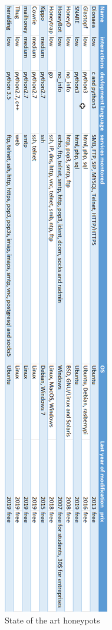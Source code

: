 \documentclass{tnreport}
\begin{document}
\begin{figure}[h!]
  \begin{center}
  \includegraphics[scale=0.7]{figures/honeypot.png}
  \caption{State of the art honeypots}
  \label{fig:hp}
  \end{center}
\end{figure}
\end{document}
